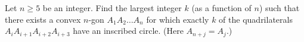 Let $n \geq 5$ be an integer. Find the largest integer $k$ (as a function of $n$) such that there exists a convex $n$-gon $A_{1}A_{2}\dots A_{n}$ for which exactly $k$ of the quadrilaterals $A_{i}A_{i+1}A_{i+2}A_{i+3}$ have an inscribed circle. (Here $A_{n+j} = A_{j}$.)